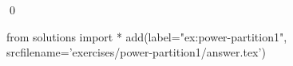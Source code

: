 
\begin{ex} 
  \label{ex:power-partition1}
  
  \qed
\end{ex} 
\begin{python0}
from solutions import *
add(label="ex:power-partition1",
    srcfilename='exercises/power-partition1/answer.tex') 
\end{python0}
